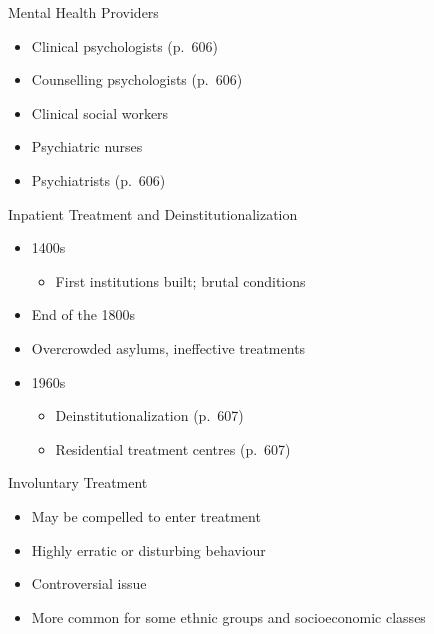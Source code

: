 \documentclass[
]{book}
\providecommand{\tightlist}{%
  \setlength{\itemsep}{0pt}\setlength{\parskip}{0pt}}
\begin{document}
\begin{reflect}
Mental Health Providers

\begin{itemize}
\tightlist
\item
  Clinical psychologists (p.~606)\\
\item
  Counselling psychologists (p.~606)\\
\item
  Clinical social workers\\
\item
  Psychiatric nurses\\
\item
  Psychiatrists (p.~606)
\end{itemize}

Inpatient Treatment and Deinstitutionalization

\begin{itemize}
\tightlist
\item
  1400s

  \begin{itemize}
  \tightlist
  \item
    First institutions built; brutal conditions\\
  \end{itemize}
\item
  End of the 1800s\\
\item
  Overcrowded asylums, ineffective treatments\\
\item
  1960s

  \begin{itemize}
  \tightlist
  \item
    Deinstitutionalization (p.~607)\\
  \item
    Residential treatment centres (p.~607)
  \end{itemize}
\end{itemize}

Involuntary Treatment

\begin{itemize}
\tightlist
\item
  May be compelled to enter treatment\\
\item
  Highly erratic or disturbing behaviour\\
\item
  Controversial issue\\
\item
  More common for some ethnic groups and socioeconomic classes
\end{itemize}


\end{reflect}
\end{document}
